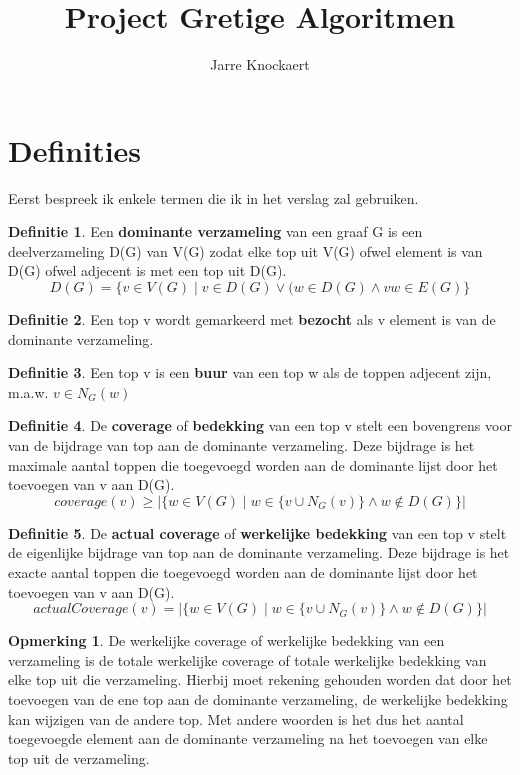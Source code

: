\documentclass[11pt, a4paper, table]{article}
\theoremstyle{definition}
\theoremstyle{definition}
\newtheorem{definitie}{Definitie}
\theoremstyle{definition}
\newtheorem{opmerking}{Opmerking}
\begin{document}
	\title{Project Gretige Algoritmen}
	\author{Jarre Knockaert}
	\maketitle
	
\thispagestyle{empty}
\newpage
{}

\section{Definities}
Eerst bespreek ik enkele termen die ik in het verslag zal gebruiken.
\begin{definitie}
	Een \textbf{dominante verzameling} van een graaf G is een deelverzameling D(G) van V(G) zodat elke top uit V(G) ofwel element is van D(G) ofwel adjecent is met een top uit D(G). 
	\begin{equation}
	D(G) = \{v \in V(G) \mid v \in D(G) \vee (w \in D(G) \land vw \in E(G)\}
	\end{equation}
\end{definitie}
\begin{definitie}
	Een top v wordt gemarkeerd met \textbf{bezocht} als v element is van de dominante verzameling.
\end{definitie}
\begin{definitie}
	Een top v is een \textbf{buur} van een top w als de toppen adjecent zijn, m.a.w. $v \in N_G(w)$
\end{definitie}
\begin{definitie}
	De \textbf{coverage} of \textbf{bedekking} van een top v stelt een bovengrens voor van de bijdrage van top aan de dominante verzameling. Deze bijdrage is het maximale aantal toppen die toegevoegd worden aan de dominante lijst door het toevoegen van v aan D(G). 
	\begin{equation}
	coverage(v) \geq \vert \{w \in V(G) \mid w \in \{v \cup N_G(v)\} \land w \not\in D(G) \}\vert
	\end{equation}
\end{definitie}
\begin{definitie}
	De \textbf{actual coverage} of \textbf{werkelijke bedekking} van een top v stelt de eigenlijke bijdrage van top aan de dominante verzameling. Deze bijdrage is het exacte aantal toppen die toegevoegd worden aan de dominante lijst door het toevoegen van v aan D(G).
	\begin{equation}
	actualCoverage(v) = \vert \{w \in V(G) \mid w \in \{v \cup N_G(v)\} \land w \not\in D(G) \}\vert
	\end{equation} 
\end{definitie}
\begin{opmerking}
	De werkelijke coverage of werkelijke bedekking van een verzameling is de totale werkelijke coverage of totale werkelijke bedekking van elke top uit die verzameling. Hierbij moet rekening gehouden worden dat door het toevoegen van de ene top aan de dominante verzameling, de werkelijke bedekking kan wijzigen van de andere top. Met andere woorden is het dus het aantal toegevoegde element aan de dominante verzameling na het toevoegen van elke top uit de verzameling. 
\end{opmerking}
\end{document}
